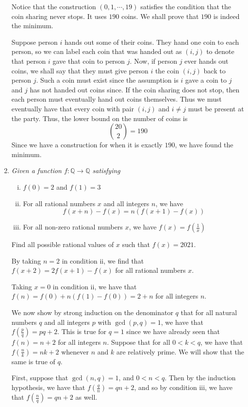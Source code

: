 \documentclass{article}
\begin{document}
\begin{enumerate}[1.]
Notice that the construction $(0, 1, \cdots, 19)$ satisfies the condition that the coin sharing never stops. It uses $190$ coins. We shall prove that $190$ is indeed the minimum.

Suppose person $i$ hands out some of their coins. They hand one coin to each person, so we can label each coin that was handed out as $(i, j)$ to denote that person $i$ gave that coin to person $j$. Now, if person $j$ ever hands out coins, we shall say that they must give person $i$ the coin $(i, j)$ back to person $j$. Such a coin must exist since the assumption is $i$ gave a coin to $j$ and $j$ has not handed out coins since. If the coin sharing does not stop, then each person must eventually hand out coins themselves. Thus we must eventually have that every coin with pair $(i, j)$ and $i \ne j$ must be present at the party. Thus, the lower bound on the number of coins is 
$$\binom{20}{2} = 190$$
Since we have a construction for when it is exactly $190$, we have found the minimum.


\item %
{\itshape Given a function $f: \mathbb{Q} \rightarrow \mathbb{Q}$ satisfying
\begin{enumerate}[i)]
  \item $f(0) = 2$ and $f(1) = 3$
  \item For all rational numbers $x$ and all integers $n$, we have 
  $$f(x + n) - f(x) = n(f(x + 1) - f(x)) $$
  \item For all non-zero rational numbers $x$, we have $f(x) = f(\frac{1}{x})$
\end{enumerate}
Find all possible rational values of $x$ such that $f(x) = 2021$.}

By taking $n = 2$ in condition ii, we find that $f(x + 2) = 2f(x + 1) - f(x)$ for all rational numbers $x$. 

Taking $x = 0$ in condition ii, we have that $f(n) = f(0) + n(f(1) - f(0)) = 2 + n$ for all integers $n$.

We now show by strong induction on the denominator $q$ that for all natural numbers $q$ and all integers $p$ with $\gcd(p, q) = 1$, we have that $f\left(\frac{p}{q}\right) = pq + 2$. This is true for $q = 1$ since we have already seen that $f(n) = n + 2$ for all integers $n$. Suppose that for all $0 < k < q$, we have that $f\left(\frac{n}{k}\right) = nk + 2$ whenever $n$ and $k$ are relatively prime. We will show that the same is true of $q$.

First, suppose that $\gcd(n, q) = 1$, and $0 < n < q$. Then by the induction hypothesis, we have that $f\left(\frac{q}{n}\right) = qn + 2$, and so by condition iii, we have that $f\left(\frac{n}{q}\right) = qn + 2$ as well.


\end{enumerate}
\end{document}

